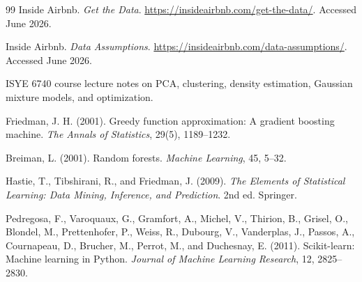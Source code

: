 \documentclass[11pt]{article}
\begin{document}
\begin{thebibliography}{99}
Inside Airbnb. \textit{Get the Data}. \url{https://insideairbnb.com/get-the-data/}. Accessed June 2026.

Inside Airbnb. \textit{Data Assumptions}. \url{https://insideairbnb.com/data-assumptions/}. Accessed June 2026.

ISYE 6740 course lecture notes on PCA, clustering, density estimation, Gaussian mixture models, and optimization.

Friedman, J. H. (2001). Greedy function approximation: A gradient boosting machine. \textit{The Annals of Statistics}, 29(5), 1189--1232.

Breiman, L. (2001). Random forests. \textit{Machine Learning}, 45, 5--32.

Hastie, T., Tibshirani, R., and Friedman, J. (2009). \textit{The Elements of Statistical Learning: Data Mining, Inference, and Prediction}. 2nd ed. Springer.

Pedregosa, F., Varoquaux, G., Gramfort, A., Michel, V., Thirion, B., Grisel, O., Blondel, M., Prettenhofer, P., Weiss, R., Dubourg, V., Vanderplas, J., Passos, A., Cournapeau, D., Brucher, M., Perrot, M., and Duchesnay, E. (2011). Scikit-learn: Machine learning in Python. \textit{Journal of Machine Learning Research}, 12, 2825--2830.
\end{thebibliography}
\end{document}
